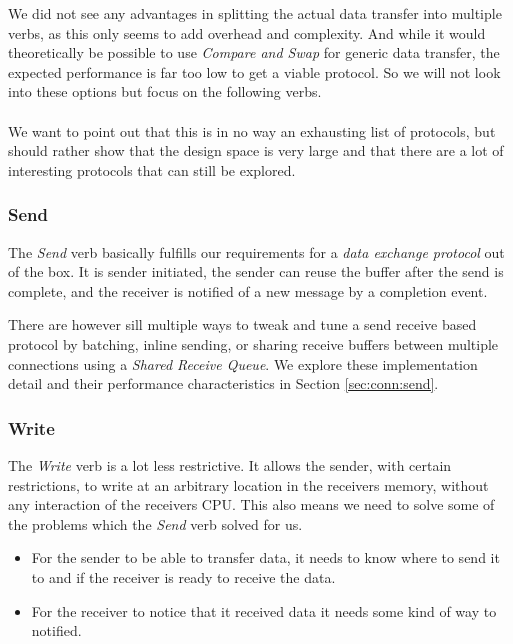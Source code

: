 We did not see any advantages in splitting the actual data transfer into multiple verbs, as this only seems to add overhead 
and complexity. And while it would theoretically be possible to use \emph{Compare and Swap} for generic data transfer,
the expected performance is far too low to get a viable protocol. So we will not look into these options but focus on the 
following verbs.

\paragraph{} We want to point out that this is in no way an exhausting list of protocols, but should rather show that the 
design space is very large and that there are a lot of interesting protocols that can still be explored.

\subsubsection{Send}
The \emph{Send} verb basically fulfills our requirements for a \emph{data exchange protocol} out of the box. It is sender
initiated, the sender can reuse the buffer after the send is complete, and the receiver is notified of a new message by
a completion event.

There are however sill multiple ways to tweak and tune a send receive based protocol by batching, inline sending, or 
sharing receive buffers between multiple connections using a \emph{Shared Receive Queue}. We explore these implementation detail and their performance
characteristics in Section \ref{sec:conn:send}.

\subsubsection{Write}
The \emph{Write} verb is a lot less restrictive. It allows the sender, with certain restrictions, to write at an arbitrary 
location in the receivers memory, without any interaction of the receivers CPU. This also means we need to solve some of the 
problems which the \emph{Send} verb solved for us.

\begin{itemize}
  \item For the sender to be able to transfer data, it needs to know where to send it to and if the receiver is ready 
to receive the data.

  \item For the receiver to notice that it received data it needs some kind of way to notified.
\end{itemize}

